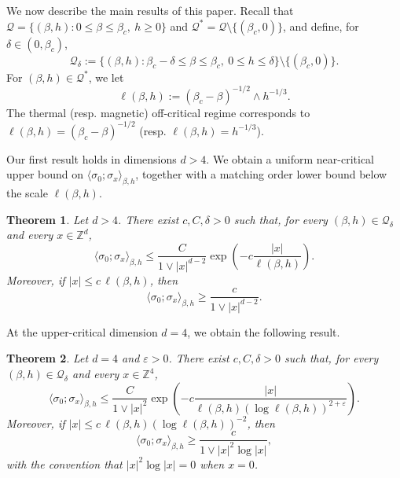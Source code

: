 \documentclass[11pt,a4paper]{article}
\numberwithin{equation}{section}
\theoremstyle{plain}
\newtheorem{Thm}{Theorem}[section]
\theoremstyle{definition}
\begin{document}
We now describe the main results of this paper. Recall that $\mathcal Q=\{(\beta,h):0\leq\beta\leq\beta_c,\ h\geq0\}$ and $\mathcal Q^*=\mathcal Q\setminus \{(\beta_c,0)\}$, and define, for $\delta\in (0,\beta_c)$,
\begin{equation}
    \mathcal Q_\delta
    :=\{(\beta,h):\beta_c-\delta\leq\beta\leq\beta_c,\
    0\leq h\leq\delta\}\setminus \{(\beta_c,0)\}.
\end{equation}
For $(\beta,h)\in \mathcal Q^*$, we let
\begin{equation}
	\ell(\beta,h):=(\beta_c-\beta)^{-1/2}\wedge h^{-1/3}.
\end{equation}
The thermal (resp. magnetic) off-critical regime corresponds to $\ell(\beta,h)=(\beta_c-\beta)^{-1/2}$ (resp. $\ell(\beta,h)=h^{-1/3}$).

Our first result holds in dimensions $d>4$. We obtain a uniform near-critical
upper bound on $\langle \sigma_0;\sigma_x\rangle_{\beta,h}$, together with a matching
order lower bound below the scale $\ell(\beta,h)$.

\begin{Thm}\label{thm:main}
Let $d>4$.  There exist $c,C,\delta>0$ such that, for every
$(\beta,h)\in\mathcal Q_\delta$ and every $x\in\mathbb Z^d$,
\begin{equation}\label{eq:main upper intro}
    \langle\sigma_0;\sigma_x\rangle_{\beta,h}
    \leq \frac{C}{1\vee|x|^{d-2}}
    \exp\left(-c\frac{|x|}{\ell(\beta,h)}\right).
\end{equation}
Moreover, if $|x|\leq c\,\ell(\beta,h)$, then
\begin{equation}\label{eq:main lower intro}
    \langle\sigma_0;\sigma_x\rangle_{\beta,h}
    \geq \frac{c}{1\vee|x|^{d-2}}.
\end{equation}
\end{Thm}

At the upper-critical dimension $d=4$, we obtain the following result.

\begin{Thm}\label{thm:main bis}
Let $d=4$ and $\varepsilon>0$.  There exist $c,C,\delta>0$ such that, for every
$(\beta,h)\in\mathcal Q_\delta$ and every $x\in\mathbb Z^4$,
\begin{equation}\label{eq:nc up bound thm bis}
    \langle\sigma_0;\sigma_x\rangle_{\beta,h}
    \leq \frac{C}{1\vee|x|^2}
    \exp\left(
        -c\frac{|x|}
        {\ell(\beta,h)(\log\ell(\beta,h))^{2+\varepsilon}}
    \right).
\end{equation}
Moreover, if
$|x|\leq c\,\ell(\beta,h)(\log\ell(\beta,h))^{-2}$, then
\begin{equation}\label{eq:main lower four intro}
    \langle\sigma_0;\sigma_x\rangle_{\beta,h}
    \geq \frac{c}{1\vee|x|^2\log|x|},
\end{equation}
with the convention that $|x|^2\log|x|=0$ when $x=0$.
\end{Thm}
\end{document}
